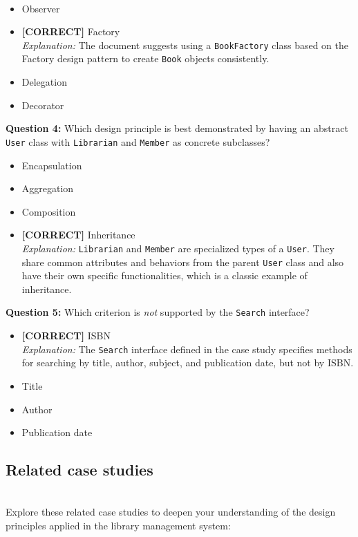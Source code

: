 \\[0.2cm]
\begin{itemize}
 \item Observer
 \item \textbf{[CORRECT]} Factory
\\[0.1cm]
\textit{Explanation:} 
The document suggests using a \texttt{BookFactory} class based on the Factory design pattern to create \texttt{Book} objects consistently.
 \item Delegation
 \item Decorator
\end{itemize}
\vspace{0.3cm}
\noindent
\textbf{Question 4:} Which design principle is best demonstrated by having an abstract \texttt{User} class with \texttt{Librarian} and \texttt{Member} as concrete subclasses?
\\[0.2cm]
\begin{itemize}
 \item Encapsulation
 \item Aggregation
 \item Composition
 \item \textbf{[CORRECT]} Inheritance
\\[0.1cm]
\textit{Explanation:} 
\texttt{Librarian} and \texttt{Member} are specialized types of a \texttt{User}. They share common attributes and behaviors from the parent \texttt{User} class and also have their own specific functionalities, which is a classic example of inheritance.
\end{itemize}
\vspace{0.3cm}
\noindent
\textbf{Question 5:} Which criterion is \emph{not} supported by the \texttt{Search} interface?
\\[0.2cm]
\begin{itemize}
 \item \textbf{[CORRECT]} ISBN
\\[0.1cm]
\textit{Explanation:} 
The \texttt{Search} interface defined in the case study specifies methods for searching by title, author, subject, and publication date, but not by ISBN.
 \item Title
 \item Author
 \item Publication date
\end{itemize}

\subsection{Related case studies}\label{nSBpLkLneTUUPUt5Rvdob}
\\
Explore these related case studies to deepen your understanding of the design principles applied in the library management system:

